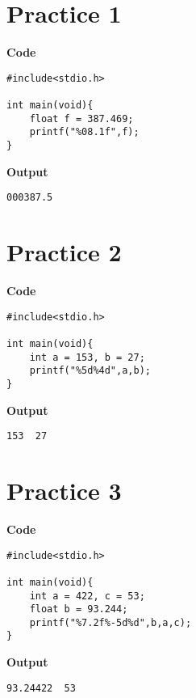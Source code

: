 \documentclass[a4paper, 11pt]{article}
\begin{document}
    \section*{Practice 1}
    \begin{minipage}[t]{0.5\textwidth}
        \large \textbf{Code}
        \begin{lstlisting}[style=code]
#include<stdio.h>

int main(void){
    float f = 387.469;
    printf("%08.1f",f);
}
        \end{lstlisting}
    \end{minipage}
    \hspace{0.5cm}
    \begin{minipage}[t]{0.5\textwidth}
        \large \textbf{Output}
        \begin{lstlisting}[style=output]
000387.5
        \end{lstlisting}
    \end{minipage}

    \section*{Practice 2}
    \begin{minipage}[t]{0.5\textwidth}
        \large \textbf{Code}
        \begin{lstlisting}[style=code]
#include<stdio.h>

int main(void){
    int a = 153, b = 27;
    printf("%5d%4d",a,b);
}
        \end{lstlisting}
    \end{minipage}
    \hspace{0.5cm}
    \begin{minipage}[t]{0.5\textwidth}
        \large \textbf{Output}
        \begin{lstlisting}[style=output]
  153  27
        \end{lstlisting}
    \end{minipage}

    \section*{Practice 3}
    \begin{minipage}[t]{0.5\textwidth}
        \large \textbf{Code}
        \begin{lstlisting}[style=code]
#include<stdio.h>

int main(void){
    int a = 422, c = 53;
    float b = 93.244;
    printf("%7.2f%-5d%d",b,a,c);
}
        \end{lstlisting}
    \end{minipage}
    \hspace{0.5cm}
    \begin{minipage}[t]{0.5\textwidth}
        \large \textbf{Output}
        \begin{lstlisting}[style=output]
  93.24422  53
        \end{lstlisting}
    \end{minipage}
\end{document}
